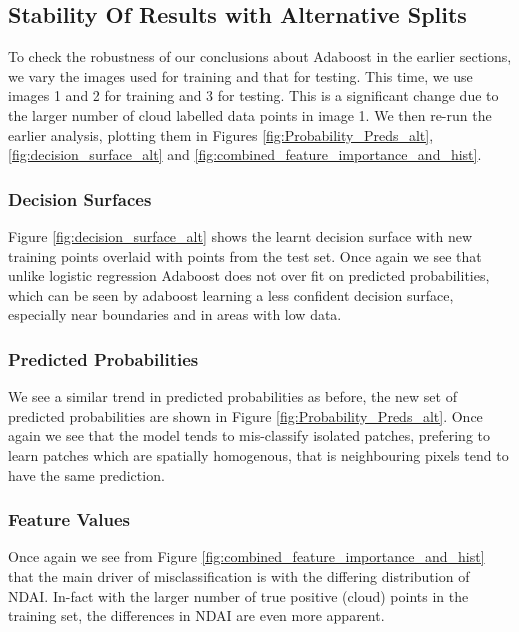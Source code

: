 \documentclass[11pt, letterpaper, journal]{IEEEtran}
\begin{document}
\subsection{Stability Of Results with Alternative Splits}
To check the robustness of our conclusions about Adaboost in the earlier sections, we vary the images used for training and that for testing. This time, we use images 1 and 2 for training and 3 for testing. This is a significant change due to the larger number of cloud labelled data points in image 1. We then re-run the earlier analysis, plotting them in Figures \ref{fig:Probability_Preds_alt}, \ref{fig:decision_surface_alt} and \ref{fig:combined_feature_importance_and_hist}.
\subsubsection{Decision Surfaces}
Figure \ref{fig:decision_surface_alt} shows the learnt decision surface with new training points overlaid with points from the test set. Once again we see that unlike logistic regression Adaboost does not over fit on predicted probabilities, which can be seen by adaboost learning a less confident decision surface, especially near boundaries and in areas with low data. 
\subsubsection{Predicted Probabilities}
We see a similar trend in predicted probabilities as before, the new set of predicted probabilities are shown in Figure \ref{fig:Probability_Preds_alt}. Once again we see that the model tends to mis-classify isolated patches, prefering to learn patches which are spatially homogenous, that is neighbouring pixels tend to have the same prediction.
\subsubsection{Feature Values}
Once again we see from Figure \ref{fig:combined_feature_importance_and_hist} that the main driver of misclassification is with the differing distribution of NDAI. In-fact with the larger number of true positive (cloud) points in the training set, the differences in NDAI are even more apparent. 
\end{document}
